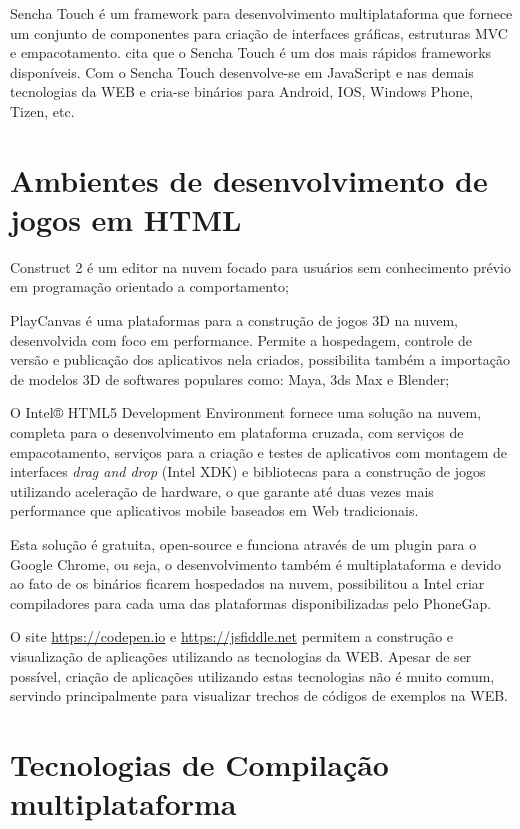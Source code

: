Sencha Touch é um framework para desenvolvimento multiplataforma
que fornece um conjunto de componentes para criação de
interfaces gráficas, estruturas MVC e empacotamento. \cite[pp.
14]{viabilityBusinessApplications} cita que o Sencha Touch é um dos
mais rápidos frameworks disponíveis. Com o Sencha Touch desenvolve-se
em JavaScript e nas demais tecnologias da WEB e cria-se binários para
Android, IOS, Windows Phone, Tizen, etc.


\chapter{Ambientes de desenvolvimento de jogos em HTML}

Construct 2 é um editor na nuvem focado para usuários sem
conhecimento prévio em programação orientado a comportamento;

PlayCanvas é uma plataformas para a construção de jogos 3D
na nuvem, desenvolvida com foco em performance. Permite a hospedagem,
controle de versão e publicação dos aplicativos nela criados,
possibilita também a importação de modelos 3D de softwares populares
como: Maya, 3ds Max e Blender;

O Intel® HTML5 Development Environment fornece uma solução na nuvem,
completa para o desenvolvimento em plataforma cruzada, com serviços de
empacotamento, serviços para a criação e testes de aplicativos com
montagem de interfaces \textit{drag and drop} (Intel XDK) e bibliotecas
para a construção de jogos utilizando aceleração de hardware, o que
garante até duas vezes mais performance que aplicativos mobile baseados
em Web tradicionais.

Esta solução é gratuita, open-source e funciona através de um
plugin para o Google Chrome, ou seja, o desenvolvimento também é
multiplataforma e devido ao fato de os binários ficarem hospedados
na nuvem, possibilitou a Intel criar compiladores para cada uma das
plataformas disponibilizadas pelo PhoneGap.

O site \url{https://codepen.io} e \url{https://jsfiddle.net} permitem a
construção e visualização de aplicações utilizando as tecnologias
da WEB. Apesar de ser possível, criação de aplicações utilizando
estas tecnologias não é muito comum, servindo principalmente para
visualizar trechos de códigos de exemplos na WEB.


\chapter{Tecnologias de Compilação multiplataforma}

